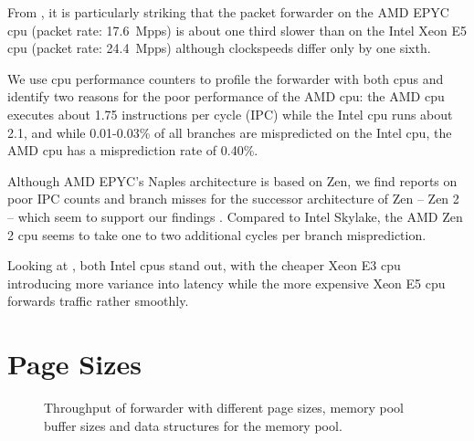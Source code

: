 From , it is particularly striking that the
packet forwarder on the AMD EPYC \ac{cpu} (packet rate: 17.6~Mpps) is about one
third slower than on the Intel Xeon E5 \ac{cpu} (packet rate: 24.4~Mpps)
although clockspeeds differ only by one sixth.

We use \ac{cpu} performance counters to profile the forwarder with both
\acp{cpu} and identify two reasons for the poor performance of the AMD \ac{cpu}:
the AMD \ac{cpu} executes about 1.75 instructions per cycle (IPC) while the
Intel \ac{cpu} runs about 2.1, and while 0.01-0.03\% of all branches are
mispredicted on the Intel \ac{cpu}, the AMD \ac{cpu} has a misprediction rate of
0.40\%.

Although AMD EPYC's Naples architecture is based on Zen, we find reports on poor
IPC counts and branch misses for the successor architecture of Zen -- Zen 2 --
which seem to support our findings \cite{lemire2019instructions,
lemire2019mispredictions}. Compared to Intel Skylake, the AMD Zen 2 \ac{cpu}
seems to take one to two additional cycles per branch misprediction.

Looking at , both Intel \acp{cpu} stand out,
with the cheaper Xeon E3 \ac{cpu} introducing more variance into latency while
the more expensive Xeon E5 \ac{cpu} forwards traffic rather smoothly.


\section{Page Sizes}
\label{sec:page_sizes}

\begin{figure}[!b]
	\centering
    \par
    \par

    \caption{Throughput of forwarder with different page sizes, memory pool
    buffer sizes and data structures for the memory pool.}
	\label{fig:page-size-throughput}
\end{figure}

